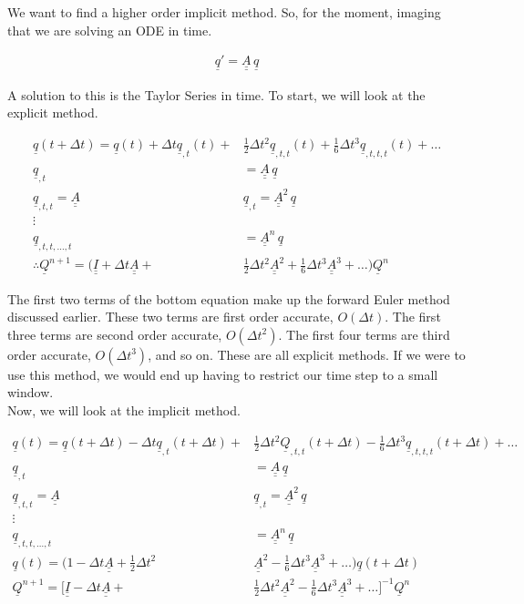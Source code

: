\documentclass[12pt]{article}
\newcommand{\bunderline}[1]{\underline{#1}}
\renewcommand{\vec}[1]{{\bunderline{#1}}}
\newcommand{\mat}[1]{{\bunderline{\bunderline{#1}}}}
\begin{document}
We want to find a higher order implicit method. So, for the moment, imaging that we are solving an ODE in time. 

\begin{align*}
\vec{q}' = \mat{A}\,\vec{q}
\end{align*}

A solution to this is the Taylor Series in time. To start, we will look at the explicit method.


\begin{align*}
\vec{q}(t + \Delta t) = \vec{q}(t) + \Delta t \vec{q}_{,t}(t) + &\frac{1}{2}\Delta t^2 \vec{q}_{,t,t}(t) + \frac{1}{6}\Delta t^3 \vec{q}_{,t,t,t}(t) + \dots \\
\vec{q}_{,t} &= \mat{A}\,\vec{q}  \\
\vec{q}_{,t,t} = \mat{A}\,&\vec{q}_{,t} = \mat{A}^2\,\vec{q} \\
\vdots& \\
\vec{q}_{,t,t,...,t} &= \mat{A}^n\,\vec{q}  \\
\therefore \vec{Q}^{n+1} = (\mat{I} + \Delta t \mat{A} + &\frac{1}{2} \Delta t^2\mat{A}^2 + \frac{1}{6}\Delta t^3 \mat{A}^3 + \dots)\vec{Q}^n
\end{align*}

The first two terms of the bottom equation make up the forward Euler method discussed earlier. These two terms are first order accurate, $O(\Delta t)$. The first three terms are second order accurate, $O(\Delta t^2)$. The first four terms are third order accurate, $O(\Delta t^3)$, and so on. These are all explicit methods. If we were to use this method, we would end up having to restrict our time step to a small window.  \\

Now, we will look at the implicit method.

\begin{align*}
\vec{q}(t) = \vec{q}(t + \Delta t) - \Delta t \vec{q}_{,t}(t + \Delta t) + &\frac{1}{2} \Delta t^2 \vec{Q}_{,t,t}(t + \Delta t) - \frac{1}{6} \Delta t^3 \vec{q}_{,t,t,t}(t + \Delta t) + \dots \\
\vec{q}_{,t} &= \mat{A}\,\vec{q} \\
\vec{q}_{,t,t} = \mat{A}\,&\vec{q}_{,t} = \mat{A}^2\,\vec{q} \\
\vdots& \\
\vec{q}_{,t,t,...,t} &= \mat{A}^n\,\vec{q} \\
\vec{q}(t) = (1 - \Delta t \mat{A} + \frac{1}{2} \Delta t^2& \mat{A}^2 - \frac{1}{6} \Delta t^3 \mat{A}^3 + \dots) \vec{q}(t + \Delta t) \\
\vec{Q}^{n+1} = [\mat{I} - \Delta t \mat{A} + &\frac{1}{2} \Delta t^2 \mat{A}^2 - \frac{1}{6} \Delta t^3 \mat{A}^3 + \dots]^{-1} \vec{Q}^n
\end{align*}
\end{document}
